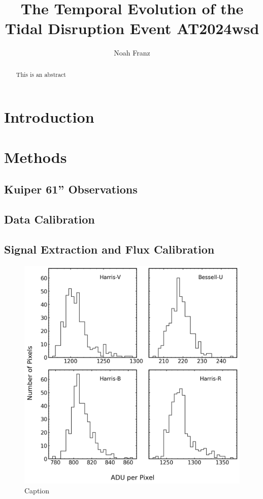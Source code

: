 \documentclass{aastex631}
\begin{document}
\title{The Temporal Evolution of the Tidal Disruption Event AT2024wsd}

\author[0000-0003-4537-3575]{Noah Franz}

\begin{abstract}
  This is an abstract
\end{abstract}

\section{Introduction}

\section{Methods}
\subsection{Kuiper 61'' Observations}
\subsection{Data Calibration}

\subsection{Signal Extraction and Flux Calibration}

\begin{figure}
  \includegraphics[width=\textwidth]{../analysis/aperture-counts-hist.png}
  \caption{Caption}
  \label{fig:aperture-counts}
\end{figure}
\end{document}
